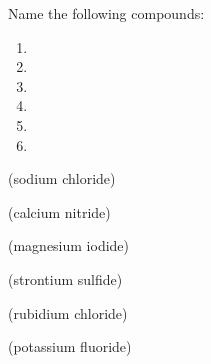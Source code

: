 \documentclass[main.tex]{subfiles}
\begin{document}
\begin{multicols*}{2}
\begin{question}[ID=\the\value{numA}]
Name the following compounds:\begin{multicols}{2}
  \noindent
  \begin{enumerate} [topsep=0pt, partopsep=1pt, label=(\alph*), leftmargin=.5cm]
\item {}  %
\item {} %
\item {} %
\item {} %
\item {} %
\item {} %
\end{enumerate}
\end{multicols}    
\end{question}
\begin{solution}
\begin{inparaenum}[(a)]
\item {}   (sodium chloride)
\item {}  (calcium nitride)
\item {}  (magnesium iodide)
\item {}  (strontium sulfide)
\item {}  (rubidium chloride)
\item {}  (potassium fluoride)
\end{inparaenum}\hspace{0.1cm}\end{solution}


\end{multicols*}
\end{document}
